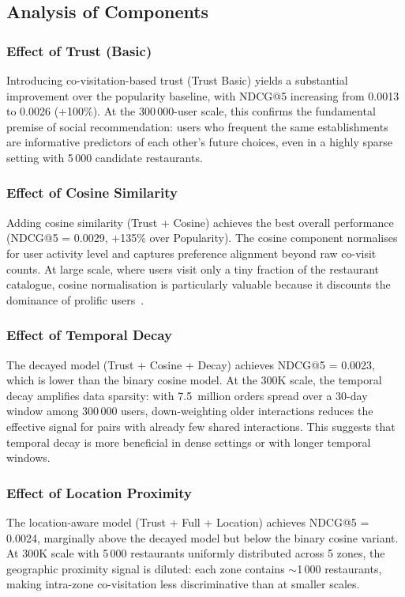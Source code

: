 \documentclass[conference]{IEEEtran}
\begin{document}
\subsection{Analysis of Components}

\subsubsection{Effect of Trust (Basic)}
Introducing co-visitation-based trust (Trust Basic) yields a substantial
improvement over the popularity baseline, with NDCG@5 increasing from
0.0013 to 0.0026 (+100\%).  At the 300\,000-user scale, this confirms
the fundamental premise of social recommendation: users who frequent the
same establishments are informative predictors of each other's future
choices, even in a highly sparse setting with 5\,000 candidate
restaurants.

\subsubsection{Effect of Cosine Similarity}
Adding cosine similarity (Trust + Cosine) achieves the best overall
performance (NDCG@5 = 0.0029, +135\% over Popularity).  The cosine
component normalises for user activity level and captures preference
alignment beyond raw co-visit counts.  At large scale, where users
visit only a tiny fraction of the restaurant catalogue, cosine
normalisation is particularly valuable because it discounts the
dominance of prolific users~\cite{sarwar2001item}.

\subsubsection{Effect of Temporal Decay}
The decayed model (Trust + Cosine + Decay) achieves NDCG@5 = 0.0023,
which is lower than the binary cosine model.  At the 300K scale, the
temporal decay amplifies data sparsity: with 7.5~million orders spread
over a 30-day window among 300\,000 users, down-weighting older
interactions reduces the effective signal for pairs with already few
shared interactions.  This suggests that temporal decay is more
beneficial in dense settings or with longer temporal windows.

\subsubsection{Effect of Location Proximity}
The location-aware model (Trust + Full + Location) achieves NDCG@5 =
0.0024, marginally above the decayed model but below the binary cosine
variant.  At 300K scale with 5\,000 restaurants uniformly distributed
across 5 zones, the geographic proximity signal is diluted: each zone
contains $\sim$1\,000 restaurants, making intra-zone co-visitation less
discriminative than at smaller scales.
\end{document}
